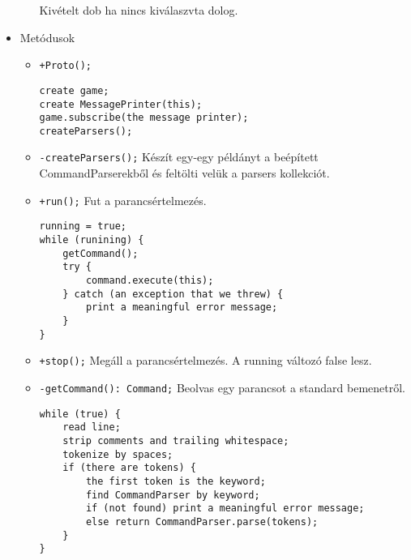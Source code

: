 \begin{itemize}
\begin{itemize}
		Kivételt dob ha nincs kiválaszvta dolog.
	\end{itemize}
\item Metódusok
	\begin{itemize}
		\item \texttt{+Proto();}
		\begin{lstlisting}
create game;
create MessagePrinter(this);
game.subscribe(the message printer);
createParsers();
		\end{lstlisting}
		\item \texttt{-createParsers();} \newline			
		Készít egy-egy példányt a beépített CommandParserekből és feltölti velük a parsers kollekciót.
		\item \texttt{+run();} \newline
		Fut a parancsértelmezés.
		\begin{lstlisting}
running = true;
while (runining) {
	getCommand();
	try {
		command.execute(this);
	} catch (an exception that we threw) {
		print a meaningful error message;
	}
}	
		\end{lstlisting}	
		\item \texttt{+stop();} \newline
		Megáll a parancsértelmezés. A running változó false lesz.
		\item \texttt{-getCommand(): Command;} \newline
		Beolvas egy parancsot a standard bemenetről.
		\begin{lstlisting}
while (true) {
	read line;
	strip comments and trailing whitespace;
	tokenize by spaces;
	if (there are tokens) {
		the first token is the keyword;
		find CommandParser by keyword;
		if (not found) print a meaningful error message;
		else return CommandParser.parse(tokens);
	}
}
		\end{lstlisting}	
		\end{itemize}
\end{itemize}

